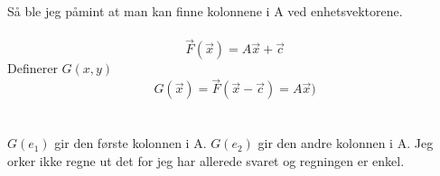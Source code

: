 Så ble jeg påmint at man kan finne
kolonnene i A ved enhetsvektorene.
\\\\
$$\vec{F}(\vec{x}) = A\vec{x} + \vec{c}$$
Definerer $G(x,y)$
$$G(\vec{x}) = \vec{F}(\vec{x} - \vec{c}) = A\vec{x})$$
\\\\
$G(e_1)$ gir den første kolonnen i A.
$G(e_2)$ gir den andre kolonnen i A.
Jeg orker ikke regne ut det for jeg har allerede svaret
og regningen er enkel.
